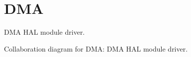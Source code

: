 \hypertarget{group__DMA}{}\section{D\+MA}
\label{group__DMA}


D\+MA H\+AL module driver.  


Collaboration diagram for D\+MA\+:
D\+MA H\+AL module driver. 

